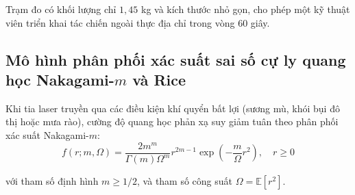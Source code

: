 Trạm đo có khối lượng chỉ $1{,}45$ kg và kích thước nhỏ gọn, cho phép một kỹ thuật viên triển khai tác chiến ngoài thực địa chỉ trong vòng 60 giây.

\subsection{Mô hình phân phối xác suất sai số cự ly quang học Nakagami-\texorpdfstring{$m$}{m} và Rice}

\hspace{0.5cm} Khi tia laser truyền qua các điều kiện khí quyển bất lợi (sương mù, khói bụi đô thị hoặc mưa rào), cường độ quang học phản xạ suy giảm tuân theo phân phối xác suất Nakagami-$m$:
\begin{equation}
f(r; m, \Omega) = \frac{2 m^m}{\Gamma(m) \Omega^m} r^{2m - 1} \exp \left( - \frac{m}{\Omega} r^2 \right), \quad r \ge 0
\label{eq:nakagami-m-fading-pdf}
\end{equation}

với tham số định hình $m \ge 1/2$, và tham số công suất $\Omega = \mathbb{E}[r^2]$.

\begin{table}[H]
\centering
\caption{Kết quả mô phỏng sai số bám bắt dưới các điều kiện khí quyển đô thị mô hình hóa theo Nakagami-$m$}
\label{tab:nakagami-atmospheric-conditions-sweep}
\end{table}


